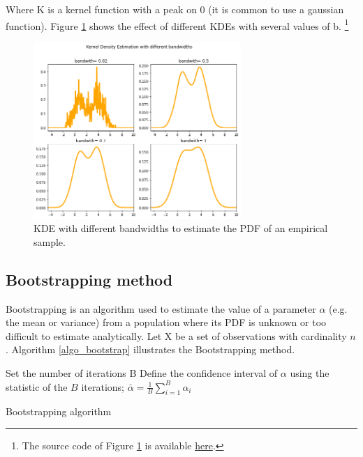 Where K is a kernel function with a peak on 0 (it is common to use a gaussian function). Figure \ref{fig_KDE} shows the effect of different KDEs with several values of b. \footnote{The source code of Figure \ref{fig_KDE} is available \href{https://github.com/aletuf93/logproj/blob/master/examples/03.\%20Statistics.ipynb}{here}.}

\begin{figure}[hbt!]
\centering
\includegraphics[width=0.7\textwidth]{SectionLetsMath/elemStat_figures/fig_KDE.png}
\captionsetup{type=figure}
\caption{KDE with different bandwidths to estimate the PDF of an empirical sample.}
\label{fig_KDE}
\end{figure}

\subsection{Bootstrapping method} \label{secBootstrapping}

Bootstrapping is an algorithm used to estimate the value of a parameter $\alpha$ (e.g. the mean or variance) from a population where its PDF is unknown or too difficult to estimate analytically.  Let X be a set of observations with cardinality $n$. Algorithm \ref{algo_bootstrap} illustrates the Bootstrapping method.

\begin{algorithm}[H]
\DontPrintSemicolon
\SetAlgoLined
Set the number of iterations B\;
Define the confidence interval of $\alpha$ using the statistic of the $B$ iterations; $\bar{\alpha}=\frac{1}{B}\sum_{i=1}^{B}\alpha_i$ \;
\caption{Bootstrapping algorithm}
\label{algo_bootstrap}
\end{algorithm}

